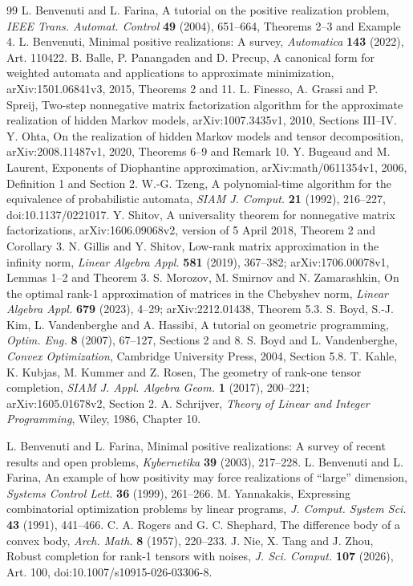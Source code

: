 \begin{thebibliography}{99}
 L. Benvenuti and L. Farina,
A tutorial on the positive realization problem,
\emph{IEEE Trans. Automat. Control} \textbf{49} (2004), 651--664,
Theorems 2--3 and Example 4.
 L. Benvenuti,
Minimal positive realizations: A survey,
\emph{Automatica} \textbf{143} (2022), Art. 110422.
 B. Balle, P. Panangaden and D. Precup,
A canonical form for weighted automata and applications to approximate minimization,
arXiv:1501.06841v3, 2015, Theorems 2 and 11.
 L. Finesso, A. Grassi and P. Spreij,
Two-step nonnegative matrix factorization algorithm for the approximate realization of hidden Markov models,
arXiv:1007.3435v1, 2010, Sections III--IV.
 Y. Ohta,
On the realization of hidden Markov models and tensor decomposition,
arXiv:2008.11487v1, 2020, Theorems 6--9 and Remark 10.
 Y. Bugeaud and M. Laurent,
Exponents of Diophantine approximation,
arXiv:math/0611354v1, 2006, Definition 1 and Section 2.
 W.-G. Tzeng,
A polynomial-time algorithm for the equivalence of probabilistic automata,
\emph{SIAM J. Comput.} \textbf{21} (1992), 216--227,
doi:10.1137/0221017.
 Y. Shitov,
A universality theorem for nonnegative matrix factorizations,
arXiv:1606.09068v2, version of 5 April 2018, Theorem 2 and Corollary 3.
 N. Gillis and Y. Shitov,
Low-rank matrix approximation in the infinity norm,
\emph{Linear Algebra Appl.} \textbf{581} (2019), 367--382;
arXiv:1706.00078v1, Lemmas 1--2 and Theorem 3.
 S. Morozov, M. Smirnov and N. Zamarashkin,
On the optimal rank-1 approximation of matrices in the Chebyshev norm,
\emph{Linear Algebra Appl.} \textbf{679} (2023), 4--29;
arXiv:2212.01438, Theorem 5.3.
 S. Boyd, S.-J. Kim, L. Vandenberghe and A. Hassibi,
A tutorial on geometric programming,
\emph{Optim. Eng.} \textbf{8} (2007), 67--127, Sections 2 and 8.
 S. Boyd and L. Vandenberghe,
\emph{Convex Optimization}, Cambridge University Press, 2004, Section 5.8.
 T. Kahle, K. Kubjas, M. Kummer and Z. Rosen,
The geometry of rank-one tensor completion,
\emph{SIAM J. Appl. Algebra Geom.} \textbf{1} (2017), 200--221;
arXiv:1605.01678v2, Section 2.
 A. Schrijver,
\emph{Theory of Linear and Integer Programming}, Wiley, 1986, Chapter 10.

 L. Benvenuti and L. Farina,
Minimal positive realizations: A survey of recent results and open problems,
\emph{Kybernetika} \textbf{39} (2003), 217--228.
 L. Benvenuti and L. Farina,
An example of how positivity may force realizations of ``large'' dimension,
\emph{Systems Control Lett.} \textbf{36} (1999), 261--266.
 M. Yannakakis,
Expressing combinatorial optimization problems by linear programs,
\emph{J. Comput. System Sci.} \textbf{43} (1991), 441--466.
 C. A. Rogers and G. C. Shephard,
The difference body of a convex body,
\emph{Arch. Math.} \textbf{8} (1957), 220--233.
 J. Nie, X. Tang and J. Zhou,
Robust completion for rank-1 tensors with noises,
\emph{J. Sci. Comput.} \textbf{107} (2026), Art. 100,
doi:10.1007/s10915-026-03306-8.



\end{thebibliography}
